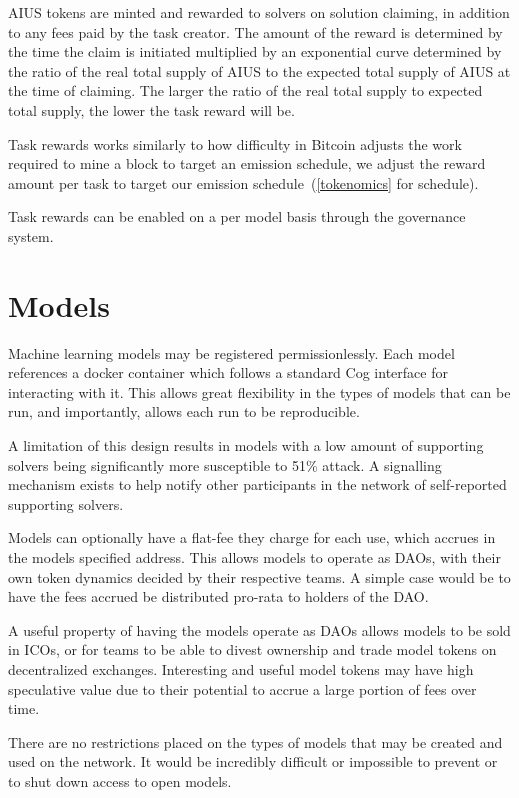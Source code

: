 \documentclass{article}
\begin{document}
AIUS tokens are minted and rewarded to solvers on solution claiming, in addition to any fees paid by the task creator. The amount of the reward is determined by the time the claim is initiated multiplied by an exponential curve determined by the ratio of the real total supply of AIUS to the expected total supply of AIUS at the time of claiming. The larger the ratio of the real total supply to expected total supply, the lower the task reward will be.

Task rewards works similarly to how difficulty in Bitcoin\cite{bitcoin} adjusts the work required to mine a block to target an emission schedule, we adjust the reward amount per task to target our emission schedule~(\ref{tokenomics} for schedule).

Task rewards can be enabled on a per model basis through the governance system.

\section{Models}

Machine learning models may be registered permissionlessly. Each model references a docker container which follows a standard Cog\cite{cog} interface for interacting with it. This allows great flexibility in the types of models that can be run, and importantly, allows each run to be reproducible.

A limitation of this design results in models with a low amount of supporting solvers being significantly more susceptible to 51\% attack. A signalling mechanism exists to help notify other participants in the network of self-reported supporting solvers.

Models can optionally have a flat-fee they charge for each use, which accrues in the models specified address. This allows models to operate as DAOs, with their own token dynamics decided by their respective teams. A simple case would be to have the fees accrued be distributed pro-rata to holders of the DAO\@.

A useful property of having the models operate as DAOs allows models to be sold in ICOs, or for teams to be able to divest ownership and trade model tokens on decentralized exchanges. Interesting and useful model tokens may have high speculative value due to their potential to accrue a large portion of fees over time.

There are no restrictions placed on the types of models that may be created and used on the network. It would be incredibly difficult or impossible to prevent or to shut down access to open models.
\end{document}
